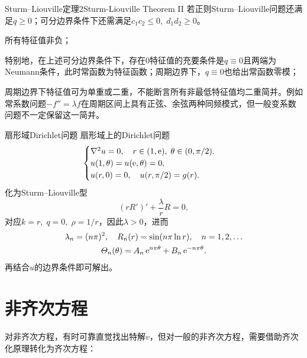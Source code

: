 \begin{theorem}{Sturm--Liouville定理2}{Sturm-Liouville Theorem II}
	若正则Sturm--Liouville问题还满足$q \geqslant 0$；可分边界条件下还需满足$c_1c_2 \leqslant 0,\;d_1d_2 \geqslant 0$。
	\begin{compactenum}
		\item 所有特征值非负；

		      特别地，在上述可分边界条件下，存在0特征值的充要条件是$q \equiv 0$且两端为Neumann条件，此时常函数为特征函数；周期边界下，$q \equiv 0$也给出常函数零模；
		\item 周期边界下特征值可为单重或二重，不能断言所有非最低特征值均二重简并。例如常系数问题$-f'' = \lambda f$在周期区间上具有正弦、余弦两种同频模式，但一般变系数问题不一定保留这一简并。
	\end{compactenum}
\end{theorem}
\begin{example}{扇形域Dirichlet问题}{}
	扇形域上的Dirichlet问题
	\begin{align*}
		\begin{cases}
			\nabla^2 u = 0,\quad r \in (1,\mathop{}\!\mathrm{e}),\;\theta \in (0,\pi/2).\\
			u(1,\theta) = u(\mathop{}\!\mathrm{e},\theta) = 0,\\
			u(r,0) = 0,\quad u(r,\pi/2) = g(r).
		\end{cases}
	\end{align*}
	化为Sturm--Liouville型
	\[
		(rR')' + \frac{\lambda}rR = 0,
	\]
	对应\(k = r,\;q = 0,\;\rho = 1/r\)，因此\(\lambda > 0\)，进而
	\begin{gather*}
		\lambda_n = (n\pi)^2,\quad R_n(r) = \sin(n\pi\ln r),\quad n = 1,2,\ldots
		\\
		\varTheta_n(\theta) = A_n\mathop{}\!\mathrm{e}^{n\pi\theta} + B_n\mathop{}\!\mathrm{e}^{-n\pi\theta}.
	\end{gather*}
	再结合$u$的边界条件即可解出。
\end{example}

\section{非齐次方程}

对非齐次方程，有时可靠直觉找出特解$v$，但对一般的非齐次方程，需要借助齐次化原理转化为齐次方程：

